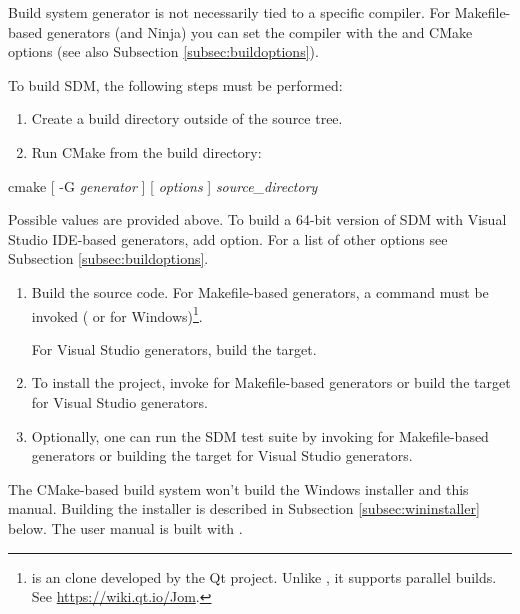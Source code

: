 \documentclass[a4paper,12pt,twoside,extrafontsizes]{memoir}
\begin{document}
Build system generator is not necessarily tied to a specific compiler. For Makefile-based generators (and Ninja) you can set the compiler with the  and  CMake options (see also Subsection \ref{subsec:buildoptions}).

To build SDM, the following steps must be performed:

\begin{enumerate}
	\item Create a build directory outside of the source tree.
	\item Run CMake from the build directory:
\end{enumerate}

\begin{shellcmds}
cmake [ -G \emph{generator} ] [ \emph{options} ] \emph{source\_directory}
\end{shellcmds}

Possible  values are provided above. To build a 64-bit version of SDM with Visual Studio IDE-based generators, add  option. For a list of other options see Subsection \ref{subsec:buildoptions}.

\begin{enumerate}[resume]
	\item Build the source code. For Makefile-based generators, a  command must be invoked ( or  for Windows)\footnote{ is an  clone developed by the Qt project. Unlike , it supports parallel builds. See \url{https://wiki.qt.io/Jom}.}.
	
	For Visual Studio generators, build the  target.
	
	\item To install the project, invoke  for Makefile-based generators or build the  target for Visual Studio generators.
	
	\item Optionally, one can run the SDM test suite by invoking  for Makefile-based generators or building the  target for Visual Studio generators.
\end{enumerate}

The CMake-based build system won't build the Windows installer and this manual. Building the installer is described in Subsection \ref{subsec:wininstaller} below. The user manual is built with .
\end{document}
